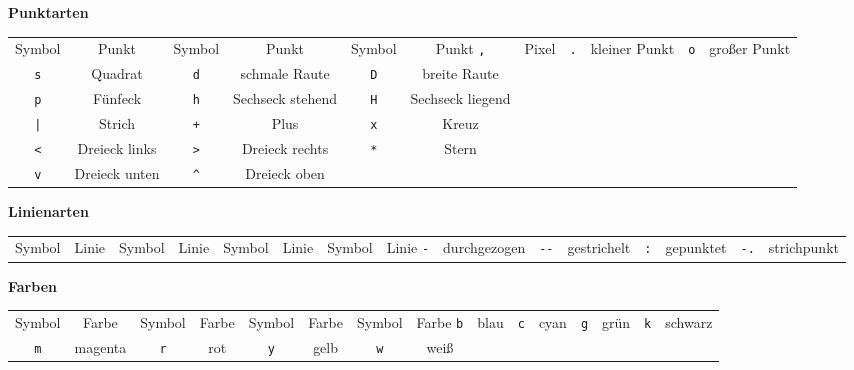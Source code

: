 \begin{tcolorbox}[title=Format-Strings für \texttt{plt.plot()}]
\textbf{Punktarten}
\vspace{-6pt}
\begin{center}
	\begin{tabular}{cc|cc|cc}
		Symbol     & Punkt         & Symbol                    & Punkt            & Symbol     & Punkt            \tabcrlf
		\texttt{,} & Pixel         & \texttt{.}                & kleiner Punkt    & \texttt{o} & großer Punkt     \\
		\texttt{s} & Quadrat       & \texttt{d}                & schmale Raute    & \texttt{D} & breite Raute     \\
		\texttt{p} & Fünfeck       & \texttt{h}                & Sechseck stehend & \texttt{H} & Sechseck liegend \\
		\texttt{|} & Strich        & \texttt{+}                & Plus             & \texttt{x} & Kreuz            \\
		\texttt{<} & Dreieck links & \texttt{>}                & Dreieck rechts   & \texttt{*} & Stern            \\
		\texttt{v} & Dreieck unten & \texttt{\textasciicircum} & Dreieck oben                                     \\
	\end{tabular}
\end{center}

\textbf{Linienarten}
\vspace{-15pt}
\begin{center}
	\begin{tabular}{cc|cc|cc|cc}
		Symbol     & Linie        & Symbol      & Linie       & Symbol     & Linie     & Symbol      & Linie       \tabcrlf
		\texttt{-} & durchgezogen & \texttt{-{}-} & gestrichelt & \texttt{:} & gepunktet & \texttt{-.} & strichpunkt \\
	\end{tabular}
\end{center}
\end{tcolorbox}
%
\begin{tcolorbox}
\textbf{Farben}
\begin{center}
	\begin{tabular}{cc|cc|cc|cc}
		Symbol     & Farbe   & Symbol     & Farbe   & Symbol     & Farbe & Symbol     & Farbe  \tabcrlf
		\texttt{b} & blau    & \texttt{c} & cyan    & \texttt{g} & grün  & \texttt{k} & schwarz \\
		\texttt{m} & magenta & \texttt{r} & rot     & \texttt{y} & gelb  & \texttt{w} & weiß    \\
	\end{tabular}
\end{center}

\label{tab:PlotFormatStrings}
\end{tcolorbox}

